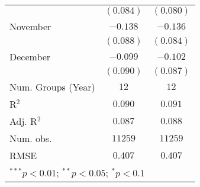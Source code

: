 \begin{table}
\begin{center}
\begin{tabular}{l c c}
                        & $(0.084)$      & $(0.080)$      \\
November                & $-0.138$       & $-0.136$       \\
                        & $(0.088)$      & $(0.084)$      \\
December                & $-0.099$       & $-0.102$       \\
                        & $(0.090)$      & $(0.087)$      \\
\midrule
Num. Groups (Year)      & $12$           & $12$           \\
R$^2$                   & $0.090$        & $0.091$        \\
Adj. R$^2$              & $0.087$        & $0.088$        \\
Num. obs.               & $11259$        & $11259$        \\
RMSE                    & $0.407$        & $0.407$        \\
\bottomrule
\multicolumn{3}{l}{\scriptsize{$^{***}p<0.01$; $^{**}p<0.05$; $^{*}p<0.1$}}
\end{tabular}
\label{table_ate_month}
\end{center}
\end{table}
